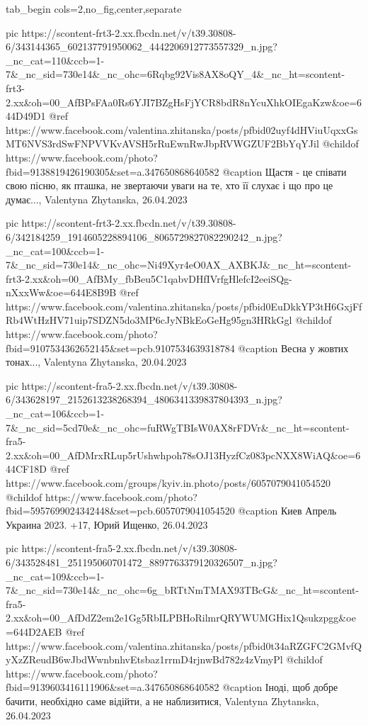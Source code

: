  
 
 
 
 

\ifcmt
  tab_begin cols=2,no_fig,center,separate

    pic https://scontent-frt3-2.xx.fbcdn.net/v/t39.30808-6/343144365_602137791950062_4442206912773557329_n.jpg?_nc_cat=110&ccb=1-7&_nc_sid=730e14&_nc_ohc=6Rqbg92Vis8AX8oQY_4&_nc_ht=scontent-frt3-2.xx&oh=00_AfBPsFAa0Rs6YJI7BZgHsFjYCR8bdR8nYcuXhkOIEgaKzw&oe=644D49D1
    @ref https://www.facebook.com/valentina.zhitanska/posts/pfbid02uyf4dHViuUqxxGsMT6NVS3rdSwFNPVVKvAVSH5rRuEwnRwJbpRVWGZUF2BbYqYJil 
    @childof https://www.facebook.com/photo?fbid=9138819426190305&set=a.347650868640582
    @caption Щастя - це співати свою пісню, як пташка, не звертаючи уваги на те, хто її слухає і що про це думає..., Valentyna Zhytanska, 26.04.2023

    pic https://scontent-frt3-2.xx.fbcdn.net/v/t39.30808-6/342184259_1914605228894106_8065729827082290242_n.jpg?_nc_cat=100&ccb=1-7&_nc_sid=730e14&_nc_ohc=Ni49Xyr4eO0AX_AXBKJ&_nc_ht=scontent-frt3-2.xx&oh=00_AfBMy_fbBeu5C1qabvDHfIVrfgHlefcI2eeiSQg-nXxxWw&oe=644E8B9B
    @ref https://www.facebook.com/valentina.zhitanska/posts/pfbid0EuDkkYP3tH6GxjFfRb4WtHzHV71uip7SDZN5do3MP6cJyNBkEoGeHg95gn3HRkGgl
    @childof https://www.facebook.com/photo?fbid=9107534362652145&set=pcb.9107534639318784
    @caption Весна у жовтих тонах..., Valentyna Zhytanska, 20.04.2023

    pic https://scontent-fra5-2.xx.fbcdn.net/v/t39.30808-6/343628197_2152613238268394_4806341339837804393_n.jpg?_nc_cat=106&ccb=1-7&_nc_sid=5cd70e&_nc_ohc=fuRWgTBIsW0AX8rFDVr&_nc_ht=scontent-fra5-2.xx&oh=00_AfDMrxRLup5rUshwhpoh78sOJ13HyzfCz083pcNXX8WiAQ&oe=644CF18D
    @ref https://www.facebook.com/groups/kyiv.in.photo/posts/6057079041054520
    @childof https://www.facebook.com/photo?fbid=5957699024342448&set=pcb.6057079041054520
    @caption Киев Апрель Украина 2023. +17, Юрий Ищенко, 26.04.2023

    pic https://scontent-fra5-2.xx.fbcdn.net/v/t39.30808-6/343528481_251195060701472_8897763379120326507_n.jpg?_nc_cat=109&ccb=1-7&_nc_sid=730e14&_nc_ohc=6g_bRTtNmTMAX93TBcG&_nc_ht=scontent-fra5-2.xx&oh=00_AfDdZ2em2e1Gg5RbILPBHoRilmrQRYWUMGHix1Qsukzpgg&oe=644D2AEB
    @ref https://www.facebook.com/valentina.zhitanska/posts/pfbid0t34aRZGFC2GMvfQyXzZReudB6wJbdWwnbnhvEtsbaz1rrmD4rjnwBd782z4zVmyPl
    @childof https://www.facebook.com/photo?fbid=9139603416111906&set=a.347650868640582
    @caption Іноді, щоб добре бачити, необхідно саме відійти, а не наблизитися, Valentyna Zhytanska, 26.04.2023

